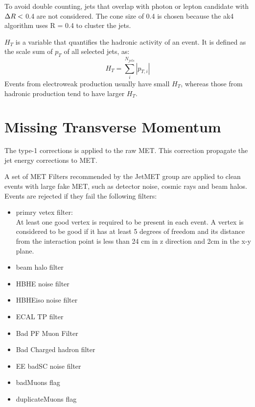\documentclass[thesis.tex]{subfiles}
\renewcommand\_{\textunderscore\allowbreak}
\begin{document}
To avoid double counting, jets that overlap with photon or lepton candidate with $\Delta R <$ 0.4 are not considered.
The cone size of 0.4 is chosen because the ak4 algorithm uses R = 0.4 to cluster the jets.  

$H_T$ is a variable that quantifies the hadronic activity of an event. 
It is defined as the scale sum of $p_T$ of all selected jets, as:
	\begin{equation*}
		 H_T = \sum_i^{N_{jets}}|p_{T,i}|
	\end{equation*}
Events from electroweak production usually have small $H_T$, whereas those from hadronic production tend to have larger $H_T$. 


\section{Missing Transverse Momentum}
The type-1 corrections is applied to the raw MET. This correction propagate the jet energy corrections to MET.

A set of MET Filters recommended by the JetMET group are applied to clean events with large fake MET, such as detector noise, cosmic rays and beam halos. Events are rejected if they fail the following filters:
\begin{center}
\begin{itemize}
\item primry vetex filter:\\
		At least one good vertex is required to be present in each event. A vertex is considered to be good if it has at least 5 degrees of freedom and its distance from the interaction point is less than 24 cm in z direction and 2cm in the x-y plane. 
\item beam halo filter
\item HBHE noise filter
\item HBHEiso noise filter
\item ECAL TP filter
\item Bad PF Muon Filter
\item Bad Charged hadron filter
\item EE badSC noise filter
\item badMuons flag
\item duplicateMuons flag
\end{itemize}
\end{center}
\end{document}

